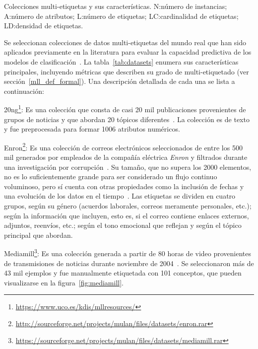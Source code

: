 \begin{table}[htbp]
	\centering
	
	\caption[Colecciones multi-etiquetas y sus características.]{Colecciones
		multi-etiquetas y sus características. N:\@ número de
		instancias; A:\@ número de atributos; L:\@ número de etiquetas; LC:\@ cardinalidad
		de etiquetas; LD:\@ densidad de etiquetas.}
	\label{tab:datasets}
\end{table}

Se seleccionan colecciones de datos multi-etiquetas del mundo real que han sido
aplicados previamente en la literatura para evaluar la capacidad predictiva de
los modelos de
clasificación~\cite{osojnik_multi-label_2017,read_scalable_2012,buyukcakir_novel_2018}.
La tabla~\ref{tab:datasets} enumera sus características principales, incluyendo
métricas que describen su grado de multi-etiquetado (ver
sección~\ref{mll_def_formal}). Una descripción detallada de cada una se lista a
continuación:

\begin{description}

	\item{20ng}\footnote{\url{https://www.uco.es/kdis/mllresources/}}: Es una
	      colección que consta de casi 20 mil publicaciones provenientes de grupos de
	      noticias y que abordan 20 tópicos diferentes~\cite{lang_newsweeder_1995}.
	      La colección es de texto y fue preprocesada para formar 1006 atributos
	      numéricos.

	\item{Enron}\footnote{\url{http://sourceforge.net/projects/mulan/files/datasets/enron.rar}}:
	      Es una colección de correos electrónicos seleccionados de entre los 500
	      mil generados por empleados de la compañía eléctrica \textit{Enron} y
	      filtrados durante una investigación por
	      corrupción~\cite{hutchison_enron_2004}. Su tamaño, que no supera los
	      2000 elementos, no es lo suficientemente grande para ser considerado un
	      flujo continuo voluminoso, pero sí cuenta con otras propiedades como la
	      inclusión de fechas y una evolución de los datos en el
	      tiempo~\cite{read_scalable_2012}. Las etiquetas se dividen en cuatro
	      grupos, según su género (acuerdos laborales, correos meramente
	      personales, etc.); según la información que incluyen, esto es, si el
	      correo contiene enlaces externos, adjuntos, reenvíos, etc.; según el
	      tono emocional que reflejan y según el tópico principal que abordan.

	\item{Mediamill}\footnote{\url{https://sourceforge.net/projects/mulan/files/datasets/mediamill.rar}}:
	      Es una colección generada a partir de 80 horas de video provenientes de
	      transmisiones de noticias durante noviembre de
	      2004~\cite{snoek_challenge_2006}. Se seleccionaron más de 43 mil
	      ejemplos y fue manualmente etiquetada con 101 conceptos, que pueden
	      visualizarse en la figura~\ref{fig:mediamill}.

\end{description}

